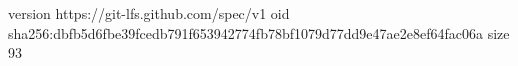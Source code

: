 version https://git-lfs.github.com/spec/v1
oid sha256:dbfb5d6fbe39fcedb791f653942774fb78bf1079d77dd9e47ae2e8ef64fac06a
size 93
